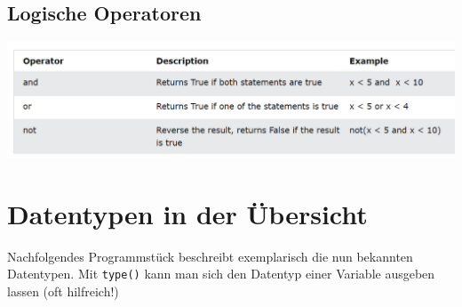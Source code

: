 \documentclass[
  oneside]{book}
\begin{document}
\hypertarget{logische-operatoren}{%
\subsection{Logische Operatoren}\label{logische-operatoren}}

\includegraphics{assets/python.assets/image (188).png}

\hypertarget{datentypen-in-der-uxfcbersicht}{%
\section{Datentypen in der Übersicht}\label{datentypen-in-der-uxfcbersicht}}

Nachfolgendes Programmstück beschreibt exemplarisch die nun bekannten Datentypen. Mit \texttt{type()} kann man sich den Datentyp einer Variable ausgeben lassen (oft hilfreich!)
\end{document}
